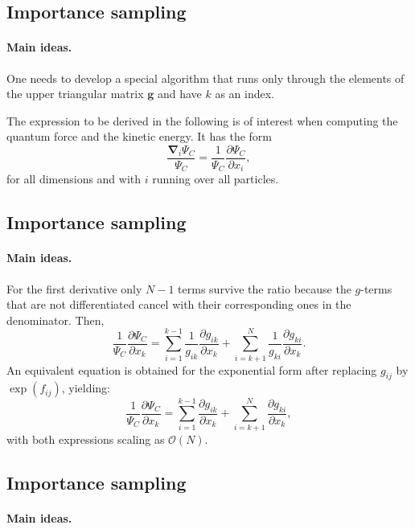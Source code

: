 \documentclass[%
twoside,                 %
final,                   %
10pt]{article}
\begin{document}
{{{{{{%
\subsection{Importance sampling}

\paragraph{Main ideas.}
One needs to develop a special algorithm 
that runs only through the elements of the upper triangular
matrix $\mathbf{g}$ and have $k$ as an index. 

The expression to be derived in the following is of interest when computing the quantum force and the kinetic energy. It has the form
\[
\frac{\mathbf{\nabla}_i\Psi_C}{\Psi_C} = \frac{1}{\Psi_C}\frac{\partial \Psi_C}{\partial x_i},
\]
for all dimensions and with $i$ running over all particles.


\subsection{Importance sampling}

\paragraph{Main ideas.}
For the first derivative only $N-1$ terms survive the ratio because the $g$-terms that are not differentiated cancel with their corresponding ones in the denominator. Then,
\[
\frac{1}{\Psi_C}\frac{\partial \Psi_C}{\partial x_k} =
\sum_{i=1}^{k-1}\frac{1}{g_{ik}}\frac{\partial g_{ik}}{\partial x_k}
+
\sum_{i=k+1}^{N}\frac{1}{g_{ki}}\frac{\partial g_{ki}}{\partial x_k}.
\]
An equivalent equation is obtained for the exponential form after replacing $g_{ij}$ by $\exp(f_{ij})$, yielding:
\[
\frac{1}{\Psi_C}\frac{\partial \Psi_C}{\partial x_k} =
\sum_{i=1}^{k-1}\frac{\partial g_{ik}}{\partial x_k}
+
\sum_{i=k+1}^{N}\frac{\partial g_{ki}}{\partial x_k},
\]
with both expressions scaling as $\mathcal{O}(N)$.




\subsection{Importance sampling}

\paragraph{Main ideas.}

}}}}}}
\end{document}

